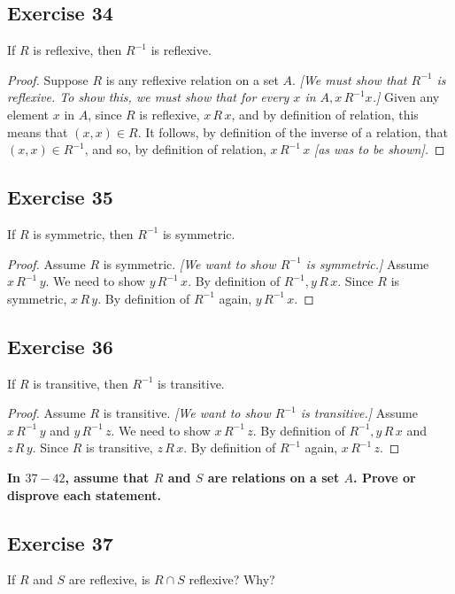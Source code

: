 \documentclass[14pt]{extarticle}
\newcommand{\cy}{\color{cyan}}
\begin{document}
\subsection{Exercise 34}
If \(R\) is reflexive, then \(R^{-1}\) is reflexive.

\begin{proof}
Suppose $R$ is any reflexive relation on a set $A$. {\it [We must show that \(R^{-1}\) is reflexive. To show this, 
we must show that for every \(x\) in \(A, x \, R^{-1} x\).]} Given any element \(x\) in \(A\), since \(R\) is 
reflexive, \(x \,R\, x\), and by definition of relation, this means that \((x, x) \in R\). It follows, by definition 
of the inverse of a relation, that \((x, x) \in R^{-1}\), and so, by definition of relation, \(x \,R^{-1}\, x\) {\it 
[as was to be shown].}
\end{proof}

\subsection{Exercise 35}
If \(R\) is symmetric, then \(R^{-1}\) is symmetric.

\begin{proof}
Assume \(R\) is symmetric. {\it [We want to show \(R^{-1}\) is symmetric.]} Assume \(x \, R^{-1} \, y\). We need to 
show \(y \, R^{-1} \, x\). By definition of \(R^{-1}, y \, R \, x\). Since \(R\) is symmetric, \(x \, R \, y\). By
definition of \(R^{-1}\) again, \(y \, R^{-1} \, x\).
\end{proof}

\subsection{Exercise 36}
If \(R\) is transitive, then \(R^{-1}\) is transitive.

\begin{proof}
Assume \(R\) is transitive. {\it [We want to show \(R^{-1}\) is transitive.]} Assume \(x \, R^{-1} \, y\) and \(y \, 
R^{-1} \, z\). We need to show \(x \, R^{-1} \, z\). By definition of \(R^{-1}, y \, R \, x\) and \(z \, R \, y\). 
Since \(R\) is transitive, \(z \, R \, x\). By definition of \(R^{-1}\) again, \(x \, R^{-1} \, z\).
\end{proof}

{\bf \cy In $37-42$, assume that \(R\) and \(S\) are relations on a set \(A\). Prove or disprove each 
statement.}

\subsection{Exercise 37}
If \(R\) and \(S\) are reflexive, is \(R \cap S\) reflexive? Why?
\end{document}
